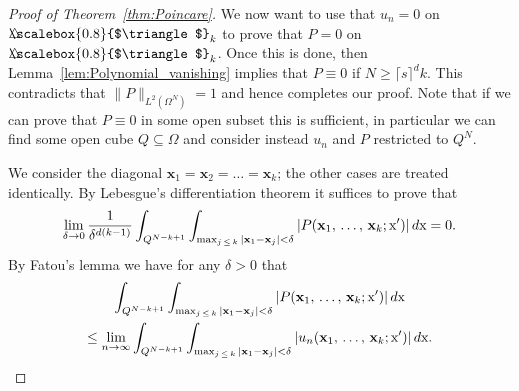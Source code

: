 \documentclass[AHL, Unicode, longabstracts, published]{cedram}
\newcommand\1{{\ensuremath {\mathds 1} }}
\newcommand{\bx}{\mathbf{x}}
\newcommand{\sx}{\textup{x}}
\newcommand{\bDelta}{{\mbox{$\triangle$}\hspace{-8.6pt}\scalebox{0.8}{$\triangle$}}}
\begin{document}
\begin{proof}[Proof of Theorem~\ref{thm:Poincare}]
We now want to use that $u_n=0$ on $\bDelta_k$ to prove that $P=0$ on $\bDelta_k$. Once this is done, then Lemma~\ref{lem:Polynomial_vanishing} implies that $P\equiv 0$ if $N \ge \lceil s \rceil^d k$. This contradicts that $\|P\|_{L^2(\Omega^N)}=1$ and hence completes our proof. Note that if we can prove that $P\equiv 0$ in some open subset this is sufficient, in particular we can find some open cube $Q\subseteq \Omega$ and consider instead $u_n$ and $P$ restricted to $Q^N$.


We consider the diagonal $\bx_1=\bx_2=\ldots = \bx_k$; the other cases are treated identically. By Lebesgue's differentiation theorem it suffices to prove that
\begin{equation}\label{eq:Lebesgue_differentiation}
\lim_{\delta\to 0}\frac{1}{\delta^{d(k-1)}}\int_{Q^{N-k+1}}\int_{\max_{j\,\leq\,k}|\bx_1-\bx_j|< \delta}|P(\bx_1, \,\ldots,\,\bx_k; \sx')| \,d\sx =0.
\end{equation}
By Fatou's lemma we have for any $\delta>0$ that
\begin{multline}\label{eq:Fatou_diagonals}
\int_{Q^{N-k+1}}\int_{\max_{j\,\leq\,k}|\bx_1-\bx_j|< \delta}|P(\bx_1,\,\ldots,\,\bx_k; \sx')| \,d\sx\\
\leq
\lim_{n\to \infty}
\int_{Q^{N-k+1}}\int_{\max_{j\,\leq\,k}|\bx_1-\bx_j|< \delta}|u_n(\bx_1,\,\ldots,\,\bx_k; \sx')| \,d\sx.
\end{multline}


\end{proof}
\end{document}
